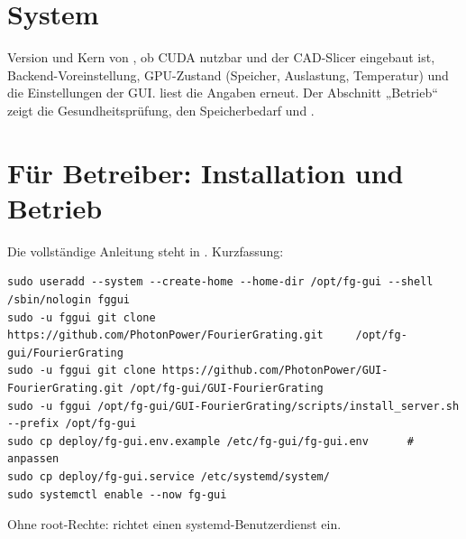 \section{System}
Version und Kern von \FG, ob CUDA nutzbar und der CAD-Slicer eingebaut ist, Backend-Voreinstellung,
GPU-Zustand (Speicher, Auslastung, Temperatur) und die Einstellungen der GUI.  liest die Angaben
erneut. Der Abschnitt „Betrieb“ zeigt die Gesundheitsprüfung, den Speicherbedarf und .

\section{Für Betreiber: Installation und Betrieb}\label{sec:gui-betrieb}
Die vollständige Anleitung steht in . Kurzfassung:
\begin{lstlisting}[style=shell]
sudo useradd --system --create-home --home-dir /opt/fg-gui --shell /sbin/nologin fggui
sudo -u fggui git clone https://github.com/PhotonPower/FourierGrating.git     /opt/fg-gui/FourierGrating
sudo -u fggui git clone https://github.com/PhotonPower/GUI-FourierGrating.git /opt/fg-gui/GUI-FourierGrating
sudo -u fggui /opt/fg-gui/GUI-FourierGrating/scripts/install_server.sh --prefix /opt/fg-gui
sudo cp deploy/fg-gui.env.example /etc/fg-gui/fg-gui.env      # anpassen
sudo cp deploy/fg-gui.service /etc/systemd/system/
sudo systemctl enable --now fg-gui
\end{lstlisting}
Ohne root-Rechte:  richtet einen systemd-Benutzerdienst ein.

